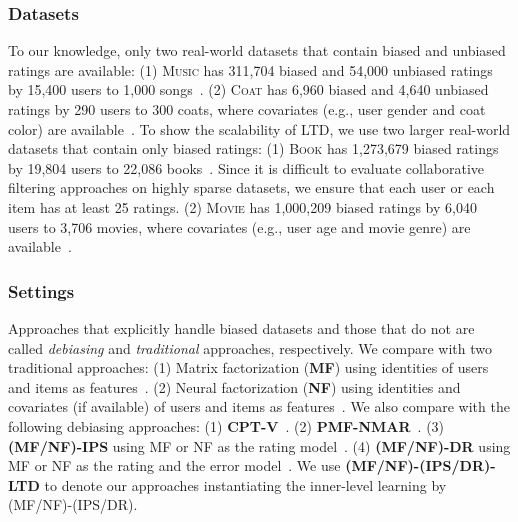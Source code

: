 \documentclass[letterpaper]{article} %
\begin{document}
\subsubsection{Datasets}
To our knowledge, only two real-world datasets that contain biased and unbiased ratings are available:
(1) \textsc{Music} has 311,704 biased and 54,000 unbiased ratings by 15,400 users to 1,000 songs~\cite{marlin2007collaborative}.
(2) \textsc{Coat} has 6,960 biased and 4,640 unbiased ratings by 290 users to 300 coats, where covariates (e.g., user gender and coat color) are available~\cite{schnabel2016recommendations}.
To show the scalability of LTD, we use two larger real-world datasets that contain only biased ratings:
(1) \textsc{Book} has 1,273,679 biased ratings by 19,804 users to 22,086 books~\cite{sun2017exploiting}.
Since it is difficult to evaluate collaborative filtering approaches on highly sparse datasets, we ensure that each user or each item has at least 25 ratings.
(2) \textsc{Movie} has 1,000,209 biased ratings by 6,040 users to 3,706 movies, where covariates (e.g., user age and movie genre) are available~\cite{dong2017hybrid}. %

\subsubsection{Settings}
Approaches that explicitly handle biased datasets and those that do not are called \emph{debiasing} and \emph{traditional} approaches, respectively.
We compare with two traditional approaches: (1) Matrix factorization (\textbf{MF}) using identities of users and items as features~\cite{koren2009matrix}. (2) Neural factorization (\textbf{NF}) using identities and covariates (if available) of users and items as features~\cite{he2017neural}.
We also compare with the following debiasing approaches: (1) \textbf{CPT-V}~\cite{marlin2009collaborative}. (2) \textbf{PMF-NMAR}~\cite{hernandez2014probabilistic}. (3) \textbf{(MF/NF)-IPS} using MF or NF as the rating model~\cite{schnabel2016recommendations}. (4) \textbf{(MF/NF)-DR} using MF or NF as the rating and the error model~\cite{wang2019doubly}.
We use \textbf{(MF/NF)-(IPS/DR)-LTD} to denote our approaches instantiating the inner-level learning by (MF/NF)-(IPS/DR).
\end{document}
